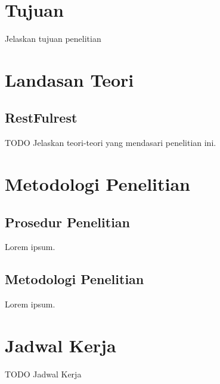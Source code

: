 \documentclass[a4paper, 12pt]{report}
\begin{document}
\section*{Tujuan}
\onehalfspacing 
\begin{flushleft}
Jelaskan tujuan penelitian
\end{flushleft}

\section*{Landasan Teori}
\onehalfspacing
\subsection*{RestFulrest}
\begin{flushleft}
TODO Jelaskan teori-teori yang mendasari penelitian ini.
\end{flushleft}

\section*{Metodologi Penelitian}

\subsection*{Prosedur Penelitian}
\begin{flushleft}
Lorem ipsum.
\end{flushleft}

\subsection*{Metodologi Penelitian}
\begin{flushleft}
Lorem ipsum.
\end{flushleft}

\section*{Jadwal Kerja}
\onehalfspacing 
\begin{flushleft}
TODO Jadwal Kerja
\end{flushleft}
\end{document}
